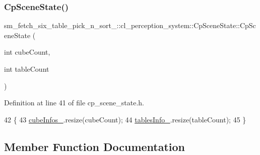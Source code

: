 \subsubsection{\texorpdfstring{Cp\+Scene\+State()}{CpSceneState()}}
{\footnotesize\ttfamily sm\+\_\+fetch\+\_\+six\+\_\+table\+\_\+pick\+\_\+n\+\_\+sort\+\_\+::cl\+\_\+perception\+\_\+system\+::\+Cp\+Scene\+State\+::\+Cp\+Scene\+State (\begin{DoxyParamCaption}\item[{int}]{cube\+Count,  }\item[{int}]{table\+Count }\end{DoxyParamCaption})\hspace{0.3cm}{\ttfamily [inline]}}



Definition at line 41 of file cp\+\_\+scene\+\_\+state.\+h.


\begin{DoxyCode}
42             \{
43                 \hyperlink{classsm__fetch__six__table__pick__n__sort__1_1_1cl__perception__system_1_1CpSceneState_a9e412e0e18779e1fe371b0160919bd9b}{cubeInfos\_}.resize(cubeCount);
44                 \hyperlink{classsm__fetch__six__table__pick__n__sort__1_1_1cl__perception__system_1_1CpSceneState_a2de6a25cdfe869099984fbf8225874cd}{tablesInfo\_}.resize(tableCount);
45             \}
\end{DoxyCode}


\subsection{Member Function Documentation}
\mbox{\label{classsm__fetch__six__table__pick__n__sort__1_1_1cl__perception__system_1_1CpSceneState_a8852f8c1ad707b55a8869974a76cf9a7}} 
